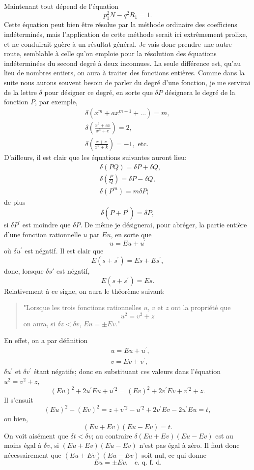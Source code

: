 \documentclass[oneside, 12 pt, leqno]{memoir}
\begin{document}
Maintenant tout dépend de l'équation
\[\tag{7} p_1^2 N-q^2 R_1=1.\]
Cette équation peut bien être résolue par la méthode ordinaire des coefficiens indéterminés, mais l'application de cette méthode serait ici extrêmement prolixe, et ne conduirait guère à un résultat général. Je vais donc prendre une autre route, semblable à celle qu'on emploie pour la résolution des équations indéterminées du second degré à deux inconnues. La seule différence est, qu'au lieu de nombres entiers, on aura à traiter des fonctions entières. Comme dans la suite nous aurons souvent besoin de parler du degré d'une fonction, je me servirai de la lettre \(\delta\) pour désigner ce degré, en sorte que \(\delta P\) désignera le degré de la fonction \(P\), par exemple,
\[\begin{gathered}
\delta\left(x^m+a x^{m-1}+\dots\right)=m, \\
\delta\left(\frac{x^5+c x}{x^3+e}\right)=2, \\
\delta\left(\frac{x+e}{x^2+k}\right)=-1, \text { etc. }
\end{gathered}\]
D’ailleurs, il est clair que les équations suivantes auront lieu:
\[\begin{aligned}
& \delta(P Q)=\delta P+\delta Q, \\
& \delta\left(\frac{P}{Q}\right)=\delta P-\delta Q, \\
& \delta\left(P^m\right)=m \delta P ;
\end{aligned}\]
de plus
\[\delta\left(P+P^{\prime}\right)=\delta P,\]
si \(\delta P^{\prime}\) est moindre que \(\delta P\). De même je désignerai, pour abréger, la partie entière d'une fonction rationnelle \(u\) par \(E u\), en sorte que
\[u=E u+u^{\prime}\]
où \(\delta u^{\prime}\) est négatif. Il est clair que
\[E\left(s+s^{\prime}\right)=E s+E s^{\prime},\]
donc, lorsque \(\delta s'\) est négatif,
\[E\left(s+s^{\prime}\right)=E s.\]
Relativement à ce signe, on aura le théorème suivant:

\begin{quote}"Lorsque les trois fonctions rationnelles \(u\), \(v\) et \(z\) ont la propriété que
\[u^2=v^2+z\]
on aura, si \(\delta z<\delta v\), \(E u= \pm E v\)."
\end{quote}

En effet, on a par définition
\[\begin{aligned}
& u=E u+u^{\prime}, \\
& v=E v+v^{\prime},
\end{aligned}\]
\(\delta u^{\prime}\) et \(\delta v^{\prime}\) étant négatifs; donc en substituant ces valeurs dans l'équation \(u^2=v^2+z\),
\[(E u)^2+2 u^{\prime} E u+u^{\prime 2}=(E v)^2+2 v^{\prime} E v+v^{\prime 2}+z.\]
Il s'ensuit
\[(E u)^2-(E v)^2=z+v^{\prime 2}-u^{\prime 2}+2 v^{\prime} E v-2 u^{\prime} E u=t,\]
ou bien,
\[(E u+E v)(E u-E v)=t.\]
On voit aisément que \(\delta t<\delta v\); au contraire \(\delta(E u+E v)(E u-E v)\) est au moins égal à \(\delta v\), si \((E u+E v)(E u-E v)\) n’est pas égal à zéro. Il faut donc nécessairement que \((E u+E v)(E u-E v)\) soit nul, ce qui donne
\[E u= \pm E v. \quad \text {c. q. f. d.}\]
\end{document}
